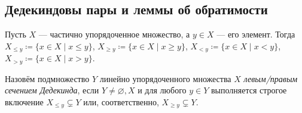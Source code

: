 \documentclass[
	extrafontsizes,
	11pt,
	hyphens,
]{memoir}
\begin{document}
\subsection{Дедекиндовы пары и леммы об обратимости}




\begin{notation}
Пусть \(X\) --- частично упорядоченное множество,
а \(y \in X\) --- его элемент.
Тогда \(X_{\leq y} \coloneqq \{x \in X \mid x \leq y\}\), \(X_{\geq y} \coloneqq \{x \in X \mid x \geq y\}\), \(X_{< y} \coloneqq \{x \in X \mid x < y\}\), \(X_{> y} \coloneqq \{x \in X \mid x > y\}\).
\end{notation}

\begin{definition}
Назовём подмножество \(Y\) линейно упорядоченного множества \(X\) \emph{левым/правым сечением Дедекинда}, если
\(Y \neq \varnothing, X\) и
для любого \(y \in Y\)
выполняется строгое включение
\(X_{\leq y} \varsubsetneq Y\)
или, соответственно,
\(X_{\geq y} \varsubsetneq Y\).
\end{definition}
\end{document}
